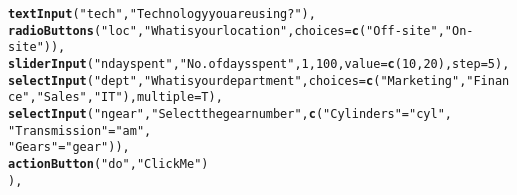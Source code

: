 \documentclass{article}\usepackage[]{graphicx}\usepackage[]{color}
\makeatletter
\newcommand{\hlnum}[1]{\textcolor[rgb]{0.686,0.059,0.569}{#1}}%
\newcommand{\hlstr}[1]{\textcolor[rgb]{0.192,0.494,0.8}{#1}}%
\newcommand{\hlstd}[1]{\textcolor[rgb]{0.345,0.345,0.345}{#1}}%
\newcommand{\hlkwc}[1]{\textcolor[rgb]{0.333,0.667,0.333}{#1}}%
\newcommand{\hlkwd}[1]{\textcolor[rgb]{0.737,0.353,0.396}{\textbf{#1}}}%
\newenvironment{kframe}{%
 \def\at@end@of@kframe{}%
 \ifinner\ifhmode%
  \def\at@end@of@kframe{\end{minipage}}%
  \begin{minipage}{\columnwidth}%
 \fi\fi%
 \def\FrameCommand##1{\hskip\@totalleftmargin \hskip-\fboxsep
 \colorbox{shadecolor}{##1}\hskip-\fboxsep
     \hskip-\linewidth \hskip-\@totalleftmargin \hskip\columnwidth}%
 \MakeFramed {\advance\hsize-\width
   \@totalleftmargin\z@ \linewidth\hsize
   \@setminipage}}%
 {\par\unskip\endMakeFramed%
 \at@end@of@kframe}
\newenvironment{knitrout}{}{} %
\makeatother
\begin{document}
\begin{knitrout}
\begin{kframe}
\begin{alltt}
             \hlkwd{textInput}\hlstd{(}\hlstr{"tech"}\hlstd{,}\hlstr{"Technology you are using?"}\hlstd{),}
             \hlkwd{radioButtons}\hlstd{(}\hlstr{"loc"}\hlstd{,} \hlstr{"What is your location"}\hlstd{,} \hlkwc{choices}\hlstd{=}\hlkwd{c}\hlstd{(}\hlstr{"Off-site"}\hlstd{,} \hlstr{"On-site"}\hlstd{)),}
             \hlkwd{sliderInput}\hlstd{(}\hlstr{"ndayspent"}\hlstd{,} \hlstr{"No. of days spent"}\hlstd{,} \hlnum{1}\hlstd{,}\hlnum{100}\hlstd{,}\hlkwc{value}\hlstd{=}\hlkwd{c}\hlstd{(}\hlnum{10}\hlstd{,}\hlnum{20}\hlstd{),} \hlkwc{step}\hlstd{=}\hlnum{5}\hlstd{),}
             \hlkwd{selectInput}\hlstd{(}\hlstr{"dept"}\hlstd{,} \hlstr{"What is your department"}\hlstd{,} \hlkwc{choices}\hlstd{=}\hlkwd{c}\hlstd{(}\hlstr{"Marketing"}\hlstd{,} \hlstr{"Finance"}\hlstd{,} \hlstr{"Sales"}\hlstd{,} \hlstr{"IT"}\hlstd{),} \hlkwc{multiple}\hlstd{=T),}
             \hlkwd{selectInput}\hlstd{(}\hlstr{"ngear"}\hlstd{,} \hlstr{"Select the gear number"}\hlstd{,} \hlkwd{c}\hlstd{(}\hlstr{"Cylinders"}\hlstd{=}\hlstr{"cyl"}\hlstd{,}
                                                              \hlstr{"Transmission"}\hlstd{=}\hlstr{"am"}\hlstd{,}
                                                              \hlstr{"Gears"}\hlstd{=}\hlstr{"gear"}\hlstd{)),}
             \hlkwd{actionButton}\hlstd{(}\hlstr{"do"}\hlstd{,} \hlstr{"Click Me"}\hlstd{)}
             \hlstd{),}


\end{alltt}
\end{kframe}
\end{knitrout}
\end{document}
